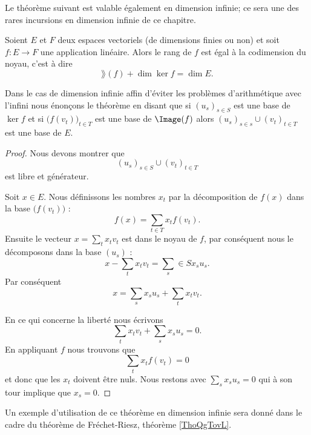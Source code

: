 Le théorème suivant est valable également en dimension infinie; ce sera une des rares incursions en dimension infinie de ce chapitre.
\begin{theorem}       \label{ThoGkkffA}
       Soient \( E\) et \( F\) deux espaces vectoriels (de dimensions finies ou non) et soit \( f\colon E\to F\) une application linéaire. Alors le rang de \( f\) est égal à la codimension du noyau, c'est à dire
       \begin{equation}
           \rang(f)+\dim\ker f=\dim E.
       \end{equation}

       Dans le cas de dimension infinie affin d'éviter les problèmes d'arithmétique avec l'infini nous énonçons le théorème en disant que si \( (u_s)_{s\in S}\) est une base de \( \ker f\) et si \( \big( f(v_t) \big)_{t\in T}\) est une base de \( \Image(f)\) alors  \( (u_s)_{s\in s}\cup (v_t)_{t\in T}\) est une base de \( E\).
\end{theorem}

\begin{proof}
    Nous devons montrer que 
    \begin{equation}
          (u_s)_{s\in S}\cup (v_t)_{t\in T}
    \end{equation}
    est libre et générateur.

    Soit \( x\in E\). Nous définissons les nombres \( x_t\) par la décomposition de \( f(x)\) dans la base \( \big( f(v_t) \big)\) :
    \begin{equation}
        f(x)=\sum_{t\in T}x_tf(v_t).
    \end{equation}
    Ensuite le vecteur \( x=\sum_tx_tv_t\) est dans le noyau de \( f\), par conséquent nous le décomposons dans la base \( (u_s)\) :
    \begin{equation}
        x-\sum_tx_tv_t=\sum_s\in S x_su_s.
    \end{equation}
    Par conséquent
    \begin{equation}
        x=\sum_sx_su_s+\sum_tx_tv_t.
    \end{equation}
    
    En ce qui concerne la liberté nous écrivons
    \begin{equation}
        \sum_tx_tv_t+\sum_sx_su_s=0.
    \end{equation}
    En appliquant \( f\) nous trouvons que 
    \begin{equation}
        \sum_tx_tf(v_t)=0
    \end{equation}
    et donc que les \( x_t\) doivent être nuls. Nous restons avec \( \sum_sx_su_s=0\) qui à son tour implique que \( x_s=0\).
\end{proof}
Un exemple d'utilisation de ce théorème en dimension infinie sera donné dans le cadre du théorème de Fréchet-Riesz, théorème \ref{ThoQgTovL}.


